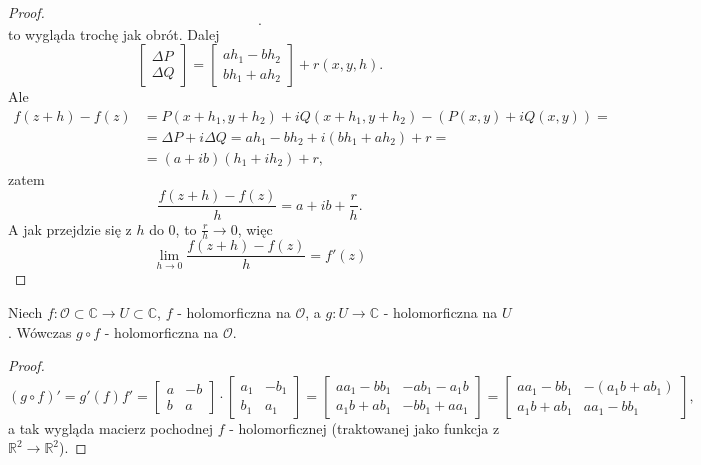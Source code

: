 \documentclass[../main.tex]{subfiles}
\begin{document}
\begin{proof}
\[        .\]
     to wygląda trochę jak obrót. Dalej
        \[
            \begin{bmatrix} \Delta P\\ \Delta Q \end{bmatrix} = \begin{bmatrix} a h_1 - b h_2\\ b h_1 + a h_2 \end{bmatrix} + r(x,y,h)
        .\]
    Ale
    \begin{align*}
        f(z+h) - f(z) &= P(x+h_1, y+h_2) + i Q(x+h_1, y+h_2) - \left( P(x,y) + i Q(x,y) \right) =\\
        &= \Delta P + i \Delta Q = a h_1 - bh_2 + i \left( bh_1 + ah_2 \right) + r = \\
        &= \left( a + ib \right) \left( h_1 + ih_2 \right) + r
    ,\end{align*}
    zatem
        \[
            \frac{f(z+h) - f(z)}{h} = a + ib + \frac{r}{h}
        .\]
    A jak przejdzie się z $h$ do $0$, to $\frac{r}{h} \to 0$, więc
        \[
            \lim\limits_{h \to 0} \frac{f(z+h) - f(z)}{h} = f'(z)
        \]
    \end{proof}
    \begin{stw}
        Niech $f: \mathcal{O}\subset\mathbb{C}\to U\subset\mathbb{C}$, $f$ - holomorficzna na $\mathcal{O}$, a $g: U \to \mathbb{C}$ - holomorficzna na $U$. Wówczas $g\circ f$ - holomorficzna na $\mathcal{O}$.
    \end{stw}
    \begin{proof}
        \[
            \left( g\circ f \right) ' = g'(f) f' = \begin{bmatrix} a& -b\\ b&a \end{bmatrix} \cdot \begin{bmatrix} a_1& -b_1\\ b_1& a_1 \end{bmatrix} = \begin{bmatrix} a a_1 - b b_1 & -ab_1 -a_1b\\ a_1b + ab_1 & -bb_1 + aa_1\end{bmatrix} = \begin{bmatrix} aa_1 - bb_1& -\left( a_1b + ab_1 \right) \\ a_1b + ab_1 & aa_1 - bb_1 \end{bmatrix}
        ,\]
    a tak wygląda macierz pochodnej $f$ - holomorficznej (traktowanej jako funkcja z $\mathbb{R}^2\to \mathbb{R}^2$).
    \end{proof}
\end{document}
